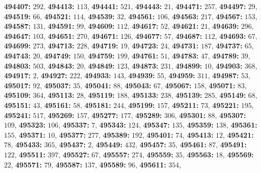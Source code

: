 \textsf{\bfseries 494407:} $292$, \textsf{\bfseries 494413:} $113$, \textsf{\bfseries 494441:} $521$, \textsf{\bfseries 494443:} $21$, \textsf{\bfseries 494471:} $257$, \textsf{\bfseries 494497:} $29$, \textsf{\bfseries 494519:} $66$, \textsf{\bfseries 494521:} $114$, \textsf{\bfseries 494539:} $32$, \textsf{\bfseries 494561:} $106$, \textsf{\bfseries 494563:} $217$, \textsf{\bfseries 494567:} $153$, \textsf{\bfseries 494587:} $131$, \textsf{\bfseries 494591:} $99$, \textsf{\bfseries 494609:} $112$, \textsf{\bfseries 494617:} $52$, \textsf{\bfseries 494621:} $21$, \textsf{\bfseries 494639:} $296$, \textsf{\bfseries 494647:} $103$, \textsf{\bfseries 494651:} $270$, \textsf{\bfseries 494671:} $126$, \textsf{\bfseries 494677:} $57$, \textsf{\bfseries 494687:} $112$, \textsf{\bfseries 494693:} $67$, \textsf{\bfseries 494699:} $273$, \textsf{\bfseries 494713:} $228$, \textsf{\bfseries 494719:} $19$, \textsf{\bfseries 494723:} $24$, \textsf{\bfseries 494731:} $187$, \textsf{\bfseries 494737:} $65$, \textsf{\bfseries 494743:} $20$, \textsf{\bfseries 494749:} $150$, \textsf{\bfseries 494759:} $199$, \textsf{\bfseries 494761:} $51$, \textsf{\bfseries 494783:} $47$, \textsf{\bfseries 494789:} $39$, \textsf{\bfseries 494803:} $503$, \textsf{\bfseries 494843:} $20$, \textsf{\bfseries 494849:} $123$, \textsf{\bfseries 494873:} $231$, \textsf{\bfseries 494899:} $10$, \textsf{\bfseries 494903:} $368$, \textsf{\bfseries 494917:} $2$, \textsf{\bfseries 494927:} $222$, \textsf{\bfseries 494933:} $143$, \textsf{\bfseries 494939:} $55$, \textsf{\bfseries 494959:} $311$, \textsf{\bfseries 494987:} $53$, \textsf{\bfseries 495017:} $92$, \textsf{\bfseries 495037:} $35$, \textsf{\bfseries 495041:} $88$, \textsf{\bfseries 495043:} $67$, \textsf{\bfseries 495067:} $158$, \textsf{\bfseries 495071:} $83$, \textsf{\bfseries 495109:} $364$, \textsf{\bfseries 495113:} $28$, \textsf{\bfseries 495119:} $188$, \textsf{\bfseries 495133:} $238$, \textsf{\bfseries 495139:} $285$, \textsf{\bfseries 495149:} $68$, \textsf{\bfseries 495151:} $43$, \textsf{\bfseries 495161:} $58$, \textsf{\bfseries 495181:} $244$, \textsf{\bfseries 495199:} $157$, \textsf{\bfseries 495211:} $73$, \textsf{\bfseries 495221:} $195$, \textsf{\bfseries 495241:} $517$, \textsf{\bfseries 495269:} $157$, \textsf{\bfseries 495277:} $177$, \textsf{\bfseries 495289:} $306$, \textsf{\bfseries 495301:} $88$, \textsf{\bfseries 495307:} $109$, \textsf{\bfseries 495323:} $106$, \textsf{\bfseries 495337:} $7$, \textsf{\bfseries 495343:} $124$, \textsf{\bfseries 495347:} $135$, \textsf{\bfseries 495359:} $138$, \textsf{\bfseries 495361:} $155$, \textsf{\bfseries 495371:} $10$, \textsf{\bfseries 495377:} $277$, \textsf{\bfseries 495389:} $192$, \textsf{\bfseries 495401:} $74$, \textsf{\bfseries 495413:} $12$, \textsf{\bfseries 495421:} $78$, \textsf{\bfseries 495433:} $365$, \textsf{\bfseries 495437:} $2$, \textsf{\bfseries 495449:} $432$, \textsf{\bfseries 495457:} $35$, \textsf{\bfseries 495461:} $87$, \textsf{\bfseries 495491:} $122$, \textsf{\bfseries 495511:} $397$, \textsf{\bfseries 495527:} $67$, \textsf{\bfseries 495557:} $274$, \textsf{\bfseries 495559:} $35$, \textsf{\bfseries 495563:} $18$, \textsf{\bfseries 495569:} $22$, \textsf{\bfseries 495571:} $79$, \textsf{\bfseries 495587:} $137$, \textsf{\bfseries 495589:} $96$, \textsf{\bfseries 495611:} $354$, 

